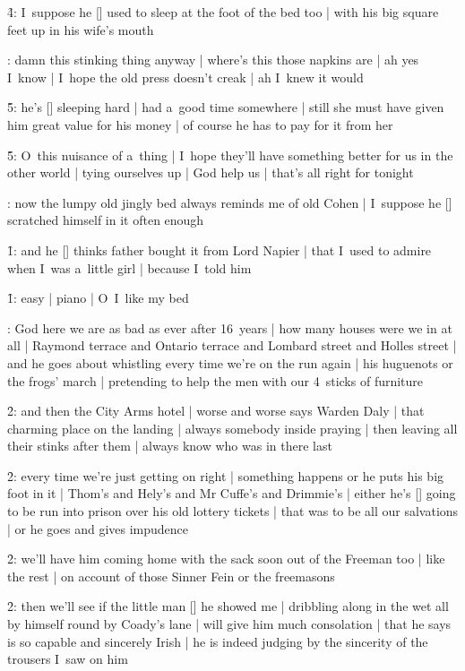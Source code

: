 \f4:
I~suppose he [\buddha] used to sleep at the foot of the bed too |
with his big square feet up in his wife's mouth

:
damn this stinking thing anyway |
where's this those napkins are |
ah yes I~know |
I~hope the old press doesn't creak |
ah I~knew it would

\f5:
he's [\bloom] sleeping hard |
had a~good time somewhere |
still she must have given him great value for his money |
of course he has to pay for it from her

\f5:
O~this nuisance of a~thing |
I~hope they'll have something better for us in the other world |
tying ourselves up |
God help us |
that's all right for tonight

:
now the lumpy old jingly bed always reminds me of old Cohen |
I~suppose he [\cohen] scratched himself in it often enough

\f1:
and he [\bloom] thinks father bought it from Lord Napier |
that I~used to admire when I~was a~little girl |
because I~told him

\f1:
easy |
piano |
O~I~like my bed

:
God here we are as bad as ever after 16~years |
how many houses were we in at all |
Raymond terrace and Ontario terrace and Lombard street and Holles street |
and he goes about whistling every time we're on the run again |
his huguenots or the frogs' march |
pretending to help the men with our 4~sticks of furniture

\f2:
and then the City Arms hotel |
worse and worse says Warden Daly |
that charming place on the landing |
always somebody inside praying |
then leaving all their stinks after them |
always know who was in there last

\f2:
every time we're just getting on right |
something happens or he puts his big foot in it |
Thom's and Hely's and Mr Cuffe's and Drimmie's |
either he's [\bloom] going to be run into prison over his old lottery tickets |
that was to be all our salvations |
or he goes and gives impudence

\f2:
we'll have him coming home with the sack soon
out of the Freeman too |
like the rest |
on account of those Sinner Fein or the freemasons

\f2:
then we'll see if the little man [\griffith] he showed me |
dribbling along in the wet all by himself round by Coady's lane |
will give him much consolation |
that he says is so capable and sincerely Irish |
he is indeed
judging by the sincerity of the trousers I~saw on him

